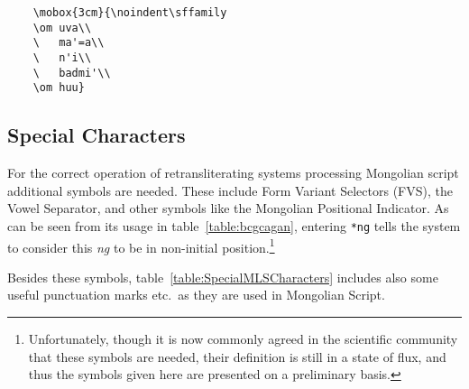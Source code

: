 \documentclass[11pt,a4paper]{article}
\begin{document}
\exa
\exb
	\begin{verbatim}
	\mobox{3cm}{\noindent\sffamily
	\om	uva\\
	\ 	ma'=a\\
	\ 	n'i\\
	\ 	badmi'\\
	\om	huu}
	\end{verbatim}
\exc
	
\subsection{Special Characters\label{section:SpecialMLSCharacters}}

For the correct operation of retransliterating systems processing
Mongolian script additional symbols are needed. These include
Form Variant Selectors (\textsf{FVS}), the Vowel Separator, and
other symbols like the Mongolian Positional Indicator. As can be
seen from its usage in table~\ref{table:bcgcagan}, entering \verb|*ng|
tells the system to consider this \emph{ng} to be in non-initial
position.\footnote{Unfortunately, though it is now commonly
agreed in the scientific community that these symbols are needed,
their definition is still in a state of flux, and thus the symbols
given here are presented on a preliminary basis.}

Besides these symbols, table~\ref{table:SpecialMLSCharacters} includes
also some useful punctuation marks etc.\ as they are used in
Mongolian Script.
\end{document}
